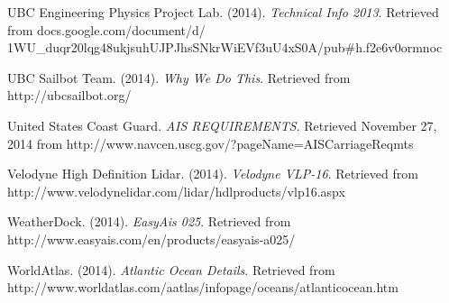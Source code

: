 \begin{thebibliography}{99}
 UBC Engineering Physics Project Lab. (2014). \textit{Technical Info 2013}. Retrieved from docs.google.com/document/d/\\1WU\_duqr20lqg48ukjsuhUJPJhsSNkrWiEVf3uU4xS0A/pub\#h.f2e6v0ormnoc

 UBC Sailbot Team. (2014). \textit{Why We Do This}. Retrieved from http://ubcsailbot.org/

 United States Coast Guard. \textit{AIS REQUIREMENTS}. Retrieved November 27, 2014 from http://www.navcen.uscg.gov/?pageName=AISCarriageReqmts

 Velodyne High Definition Lidar. (2014). \textit{Velodyne VLP-16}. Retrieved from http://www.velodynelidar.com/lidar/hdlproducts/vlp16.aspx

 WeatherDock. (2014). \textit{EasyAis 025}. Retrieved from http://www.easyais.com/en/products/easyais-a025/

 WorldAtlas. (2014). \textit{Atlantic Ocean Details}. Retrieved from http://www.worldatlas.com/aatlas/infopage/oceans/atlanticocean.htm

\end{thebibliography}